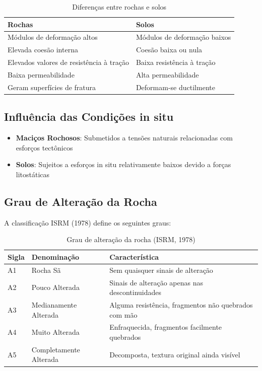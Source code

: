 \documentclass[12pt,a4paper,twoside]{book}
\begin{document}
\begin{table}[h]
\centering
\begin{tabular}{|l|l|}
\hline
\textbf{Rochas} & \textbf{Solos} \\
\hline
Módulos de deformação altos & Módulos de deformação baixos \\
\hline
Elevada coesão interna & Coesão baixa ou nula \\
\hline
Elevados valores de resistência à tração & Baixa resistência à tração \\
\hline
Baixa permeabilidade & Alta permeabilidade \\
\hline
Geram superfícies de fratura & Deformam-se ductilmente \\
\hline
\end{tabular}
\caption{Diferenças entre rochas e solos}
\label{tab:rochas_solos}
\end{table}

\subsection{Influência das Condições in situ}

\begin{itemize}
    \item \textbf{Maciços Rochosos}: Submetidos a tensões naturais relacionadas com esforços tectônicos
    \item \textbf{Solos}: Sujeitos a esforços in situ relativamente baixos devido a forças litostáticas
\end{itemize}

\subsection{Grau de Alteração da Rocha}

A classificação ISRM (1978) define os seguintes graus:

\begin{table}[h]
\centering
\begin{tabular}{|l|l|l|}
\hline
\textbf{Sigla} & \textbf{Denominação} & \textbf{Característica} \\
\hline
A1 & Rocha Sã & Sem quaisquer sinais de alteração \\
\hline
A2 & Pouco Alterada & Sinais de alteração apenas nas descontinuidades \\
\hline
A3 & Medianamente Alterada & Alguma resistência, fragmentos não quebrados com mão \\
\hline
A4 & Muito Alterada & Enfraquecida, fragmentos facilmente quebrados \\
\hline
A5 & Completamente Alterada & Decomposta, textura original ainda visível \\
\hline
\end{tabular}
\caption{Grau de alteração da rocha (ISRM, 1978)}
\label{tab:alteracao}
\end{table}
\end{document}
